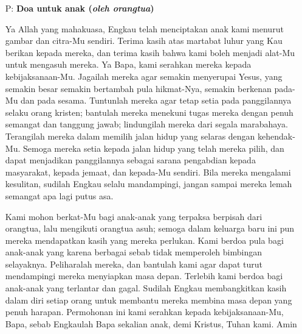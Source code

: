 \documentclass[a5paper,12pt,openany]{scrbook}
\newcommand{\BP}[1]{\begin{itemize} \item[P:] #1 \end{itemize}}
\begin{document}
\BP{\textbf{Doa untuk anak (\textit{oleh orangtua})}

Ya Allah yang mahakuasa, Engkau telah menciptakan anak kami menurut gambar dan citra-Mu sendiri. Terima kasih atas martabat luhur yang Kau berikan kepada mereka, dan terima kasih bahwa kami boleh menjadi alat-Mu untuk mengasuh mereka. Ya Bapa, kami serahkan mereka kepada kebijaksanaan-Mu. Jagailah mereka agar semakin menyerupai Yesus, yang semakin besar semakin bertambah pula hikmat-Nya, semakin berkenan pada-Mu dan pada sesama. Tuntunlah mereka agar tetap setia pada panggilannya selaku orang kristen; bantulah mereka menekuni tugas mereka dengan penuh semangat dan tanggung jawab; lindungilah mereka dari segala marabahaya. Terangilah mereka dalam memilih jalan hidup yang selaras dengan kehendak-Mu. Semoga mereka setia kepada jalan hidup yang telah mereka pilih, dan dapat menjadikan panggilannya sebagai sarana pengabdian kepada masyarakat, kepada jemaat, dan kepada-Mu sendiri. Bila mereka mengalami kesulitan, sudilah Engkau selalu mandampingi, jangan sampai mereka lemah semangat apa lagi putus asa.

Kami mohon berkat-Mu bagi anak-anak yang terpaksa berpisah dari orangtua, lalu mengikuti orangtua asuh; semoga dalam keluarga baru ini pun mereka mendapatkan kasih yang mereka perlukan. Kami berdoa pula bagi anak-anak yang karena berbagai sebab tidak memperoleh bimbingan selayaknya. Peliharalah mereka, dan bantulah kami agar dapat turut mendampingi mereka menyiapkan masa depan.
Terlebih kami berdoa bagi anak-anak yang terlantar dan gagal. Sudilah Engkau membangkitkan kasih dalam diri setiap orang untuk membantu mereka membina masa depan yang penuh harapan.
Permohonan ini kami serahkan kepada kebijaksanaan-Mu, Bapa, sebab Engkaulah Bapa sekalian anak, demi Kristus, Tuhan kami. Amin}
\end{document}
